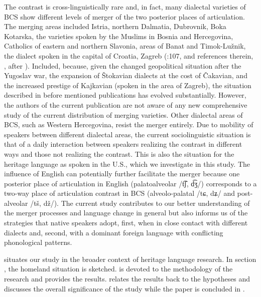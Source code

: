 \documentclass[output=paper,
modfonts,
newtxmath,
hidelinks,
]{langscibook}
\begin{document}
The contrast is cross-linguistically rare and, in fact, many dialectal varieties of BCS show different levels of merger of the two posterior places of articulation. The merging areas included Istria, northern Dalmatia, Dubrovnik, Boka Kotarska, the varieties spoken by the Muslims in Bosnia and Hercegovina, Catholics of eastern and northern Slavonia, areas of Banat and Timok-Lužnik, the dialect spoken in the capital of Croatia, Zagreb (\citealt{Stankiewicz1986}:107, and references therein, \citealt[296]{Ivic1958}, \citealt{Zygis2003} after \citealt{Ivic1958}). Included, because, given the changed geopolitical situation after the Yugoslav war, the expansion of Štokavian dialects at the cost of Čakavian, and the increased prestige of Kajkavian (spoken in the area of Zagreb), the situation described in before mentioned publications has evolved substantially. However, the authors of the current publication are not aware of any new comprehensive study of the current distribution of merging varieties. Other dialectal areas of BCS, such as Western Hercegovina, resist the merger entirely. Due to mobility of speakers between different dialectal areas, the current sociolinguistic situation is that of a daily interaction between speakers realizing the contrast in different ways and those not realizing the contrast. This is also the situation for the heritage language as spoken in the U.S., which we investigate in this study. The influence of English can potentially further facilitate the merger because one posterior place of articulation in English (palatoalveolar /t͡ʃ, d͡ʒ/) corresponds to a two-way place of articulation contrast in BCS (alveolo-palatal /tɕ, dʑ/ and post-alveolar /tš, dž/). The current study contributes to our better understanding of the merger processes and language change in general but also informs us of the strategies that native speakers adopt, first, when in close contact with different dialects and, second, with a dominant foreign language with conflicting phonological patterns.



 situates our study in the broader context of heritage language research. 
In section , the homeland situation is sketched.  is devoted to the methodology of the research and  provides the results. 
 relates the results back to the hypotheses and discusses the overall significance of the study while the paper is concluded in .
\end{document}
